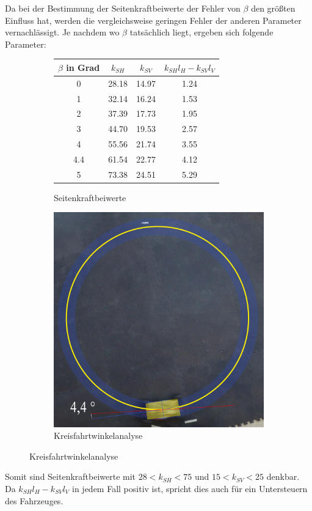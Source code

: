 Da bei der Bestimmung der Seitenkraftbeiwerte der Fehler von $\beta$ den größten Einfluss hat, werden die vergleichsweise geringen Fehler der anderen Parameter vernachlässigt. Je nachdem wo $\beta$ tatsächlich liegt, ergeben sich folgende Parameter:

\begin{center}
\begin{figure}[H]
\begin{subfigure}{.5\textwidth}
	\centering
	\begin{tabular}{|c|c|c|c|}
\hline
$\beta$ in Grad & $k_{SH}$& $k_{SV}$&$k_{SH}l_H-k_{SV}l_V$ \\\hline

0  & 28.18 & 14.97&1.24\\\hline
1  & 32.14 & 16.24&1.53\\\hline
2  & 37.39 & 17.73&1.95\\\hline
3  & 44.70 & 19.53&2.57\\\hline
4  & 55.56 & 21.74&3.55\\\hline
4.4  & 61.54 & 22.77&4.12\\\hline
5  & 73.38 & 24.51&5.29\\\hline

\end{tabular}
	\caption{Seitenkraftbeiwerte}
	\label{fig:Seitenkraftbeiwerte}
\end{subfigure}
\begin{subfigure}{.4\textwidth}
	\centering
	\includegraphics[scale=0.07]{Figures/Schwimmwinkel.png}
	\caption{Kreisfahrtwinkelanalyse}
	\label{fig:Kreis}
\end{subfigure}
\end{figure}
\end{center}\vspace{-0.7cm}
Somit sind Seitenkraftbeiwerte mit $28<k_{SH}<75$ und $15<k_{SV}<25$ denkbar. Da $k_{SH}l_H-k_{SV}l_V$ in jedem Fall positiv ist, spricht dies auch für ein Untersteuern des Fahrzeuges.

